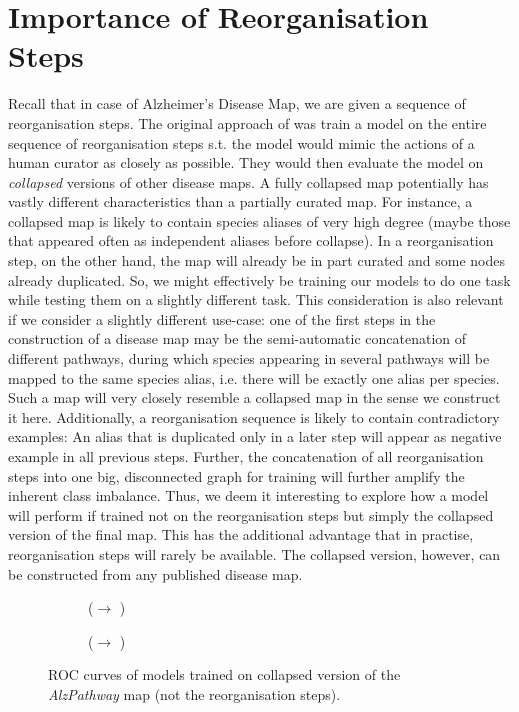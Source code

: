 \documentclass[
	fontsize=10pt, %
	twoside=false, %
	secnumdepth=1, %
  toc=indentunnumbered %
]{kaobook}
\begin{document}
\section{Importance of Reorganisation Steps}
Recall that in case of Alzheimer's Disease Map, we are
given a sequence of reorganisation steps. The original approach of \nielsen{} was
train a model on the entire sequence of reorganisation steps s.t. the model
would mimic the actions of a human curator as closely as possible. They would
then evaluate the model on \textit{collapsed} versions of other disease maps.
%
A fully collapsed map potentially has vastly different characteristics than a
partially curated map. For instance, a collapsed map is likely to contain
species aliases of very high degree (maybe those that appeared often as
independent aliases before collapse). In a reorganisation step, on the other
hand, the map will already be in part curated and some nodes already duplicated.
%
So, we might effectively be training our models to do one task while testing
them on a slightly different task.
%
This consideration is also relevant if we consider a slightly different
use-case: one of the first steps in the construction of a disease map may be the
semi-automatic concatenation of different pathways, during which species
appearing in several pathways will be mapped to the same species alias, i.e.
there will be exactly one alias per species. Such a map will very closely
resemble a collapsed map in the sense we construct it here.
%
Additionally, a reorganisation sequence is likely to contain contradictory
examples: An alias that is duplicated only in a later step will appear as
negative example in all previous steps. Further, the concatenation of all
reorganisation steps into one big, disconnected graph for training
will further amplify the inherent class imbalance.
%
Thus, we deem it interesting to explore how a model will perform if trained not
on the reorganisation steps but simply the collapsed version of the final map.
%
This has the additional advantage that in practise, reorganisation steps will
rarely be available. The collapsed version, however, can be constructed from any
published disease map.

\begin{figure}[h]
  \centering
  \begin{subfigure}[h]{0.48\linewidth}
    \caption{(\ADLast $\rightarrow$ \PDMap)}
  \end{subfigure}
  \begin{subfigure}[h]{0.48\linewidth}
    \caption{(\ADLast $\rightarrow$ \ReconMap{})}
  \end{subfigure}
  \caption{ROC curves of models trained on collapsed version of the
    \textit{AlzPathway} map (not the reorganisation steps).}
  \label{fig:importance-reorganisation-steps}
\end{figure}
\end{document}
